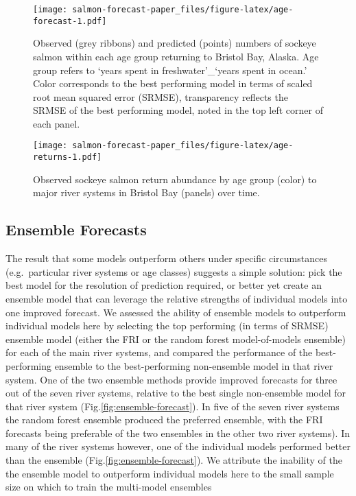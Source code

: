 \documentclass[
]{article}
\begin{document}
\begin{figure}
\centering
\texttt{[image: salmon-forecast-paper\_files/figure-latex/age-forecast-1.pdf]}
\caption{\label{fig:age-forecast}Observed (grey ribbons) and predicted (points) numbers of sockeye salmon within each age group returning to Bristol Bay, Alaska. Age group refers to `years spent in freshwater'\_`years spent in ocean.' Color corresponds to the best performing model in terms of scaled root mean squared error (SRMSE), transparency reflects the SRMSE of the best performing model, noted in the top left corner of each panel.}
\end{figure}

\begin{figure}
\centering
\texttt{[image: salmon-forecast-paper\_files/figure-latex/age-returns-1.pdf]}
\caption{\label{fig:age-returns}Observed sockeye salmon return abundance by age group (color) to major river systems in Bristol Bay (panels) over time.}
\end{figure}

\hypertarget{ensemble-forecasts}{%
\subsection*{Ensemble Forecasts}\label{ensemble-forecasts}}

The result that some models outperform others under specific circumstances (e.g.~particular river systems or age classes) suggests a simple solution: pick the best model for the resolution of prediction required, or better yet create an ensemble model that can leverage the relative strengths of individual models into one improved forecast. We assessed the ability of ensemble models to outperform individual models here by selecting the top performing (in terms of SRMSE) ensemble model (either the FRI or the random forest model-of-models ensemble) for each of the main river systems, and compared the performance of the best-performing ensemble to the best-performing non-ensemble model in that river system. One of the two ensemble methods provide improved forecasts for three out of the seven river systems, relative to the best single non-ensemble model for that river system (Fig.\ref{fig:ensemble-forecast}). In five of the seven river systems the random forest ensemble produced the preferred ensemble, with the FRI forecasts being preferable of the two ensembles in the other two river systems). In many of the river systems however, one of the individual models performed better than the ensemble (Fig.\ref{fig:ensemble-forecast}). We attribute the inability of the the ensemble model to outperform individual models here to the small sample size on which to train the multi-model ensembles
\end{document}
